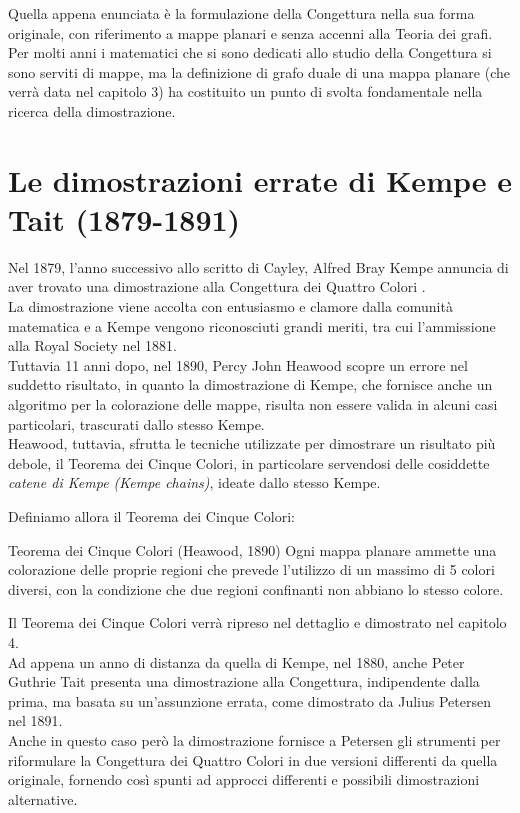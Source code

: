 \documentclass[a4paper,12pt,titlepage]{report}
\begin{document}
	Quella appena enunciata è la formulazione della Congettura nella sua forma originale, con riferimento a mappe planari e senza accenni alla Teoria dei grafi.
	\\Per molti anni i matematici che si sono dedicati allo studio della Congettura si sono serviti di mappe, ma la definizione di grafo duale di una mappa planare (che verrà data nel capitolo 3) ha costituito un punto di svolta fondamentale nella ricerca della dimostrazione.
	
	\section[Le dimostrazioni errate]{Le dimostrazioni errate di Kempe e Tait (1879-1891)}
	Nel 1879, l’anno successivo allo scritto di Cayley, Alfred Bray Kempe annuncia di aver trovato una dimostrazione alla Congettura dei Quattro Colori {\bfseries \cite{Kempe}}.
	\\La dimostrazione viene accolta con entusiasmo e clamore dalla comunità matematica e a Kempe vengono riconosciuti grandi meriti, tra cui l'ammissione alla Royal Society nel 1881. \\Tuttavia 11 anni dopo, nel 1890, Percy John Heawood scopre un errore nel suddetto risultato, in quanto la dimostrazione di Kempe, che fornisce anche un algoritmo per la colorazione delle mappe, risulta non essere valida in alcuni casi particolari, trascurati dallo stesso Kempe.
	\\Heawood, tuttavia, sfrutta le tecniche utilizzate per dimostrare un risultato più debole, il Teorema dei Cinque Colori, in particolare servendosi delle cosiddette \emph{catene di Kempe (Kempe chains)}, ideate dallo stesso Kempe.
	
	Definiamo allora il Teorema dei Cinque Colori:
	\begin{namedthm*}{Teorema dei Cinque Colori (Heawood, 1890)}
		Ogni mappa planare ammette una colorazione delle proprie regioni che prevede l'utilizzo di un massimo di 5 colori diversi, con la condizione che due regioni confinanti non abbiano lo stesso colore.
	\end{namedthm*}
	Il Teorema dei Cinque Colori verrà ripreso nel dettaglio e dimostrato nel capitolo 4.
	\\Ad appena un anno di distanza da quella di Kempe, nel 1880, anche Peter Guthrie Tait presenta una dimostrazione alla Congettura, indipendente dalla prima, ma basata su un’assunzione errata, come dimostrato da Julius Petersen nel 1891. 
	\\Anche in questo caso però la dimostrazione fornisce a Petersen gli strumenti per riformulare la Congettura dei Quattro Colori in due versioni differenti da quella originale, fornendo così spunti ad approcci differenti e possibili dimostrazioni alternative.
	
\end{document}
